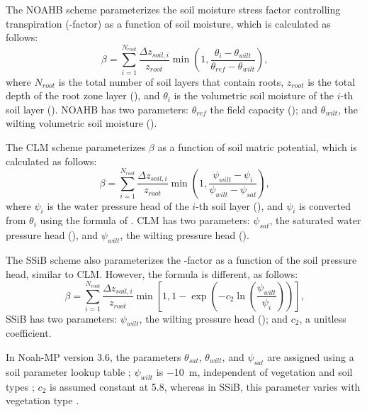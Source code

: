 \documentclass[essd, manuscript]{copernicus}
\let\unit\undefined
\begin{document}
The NOAHB scheme parameterizes the soil moisture stress factor controlling transpiration (\beta{}-factor) as a function of soil moisture, which is calculated as follows:
\begin{equation}
  \beta = \sum_{i=1}^{N_{root}} \frac{\Delta z_{soil,i}}{z_{root}}
  \min(1, \frac{\theta_i - \theta_{wilt}}{\theta_{ref} - \theta_{wilt}})
  \text{,}
\end{equation}
where \(N_{root}\) is the total number of soil layers that contain roots, \(z_{root}\) is the total depth of the root zone layer (\unit{m}), and \(\theta_i\) is the volumetric soil moisture of the \(i\)-th soil layer (\unit{m^3.m^{-3}}). NOAHB has two parameters: \(\theta_{ref}\) the field capacity (\unit{m^3.m^{-3}}); and \(\theta_{wilt}\), the wilting volumetric soil moisture (\unit{m^3.m^{-3}}).

The CLM scheme \citep{oleson2004} parameterizes \(\beta\) as a function of soil matric potential, which is calculated as follows:
\begin{equation}
  \beta = \sum_{i=1}^{N_{root}} \frac{\Delta z_{soil,i}}{z_{root}}
  \min(1, \frac{\psi_{wilt} - \psi_i}{\psi_{wilt} - \psi_{sat}})
  \text{,}
\end{equation}
where \(\psi_i\) is the water pressure head of the \(i\)-th soil layer (\unit{m}), and \(\psi_i\) is converted from \(\theta_i\) using the formula of \citet{clapp1978WRR}. CLM has two parameters: \(\psi_{sat}\), the saturated water pressure head (\unit{m}), and \(\psi_{wilt}\), the wilting pressure head (\unit{m}).

The SSiB scheme \citet{xue1991JC} also parameterizes the \beta{}-factor as a function of the soil pressure head, similar to CLM\@. However, the formula is different, as follows:
\begin{equation}
  \beta = \sum_{i=1}^{N_{root}} \frac{\Delta z_{soil,i}}{z_{root}}
  \min\left[1, 1 - \exp\left(-c_2 \ln(\frac{\psi_{wilt}}{\psi_{i}})\right)\right]
  \text{,}
\end{equation}
SSiB has two parameters: \(\psi_{wilt}\), the wilting pressure head (\unit{m}); and \(c_2\), a unitless coefficient.

In Noah-MP version 3.6, the parameters \(\theta_{sat}\), \(\theta_{wilt}\), and \(\psi_{sat}\) are assigned using a soil parameter lookup table \citep[Table 2]{chen2001MWR}; \(\psi_{wilt}\) is \qty{-10}{m}, independent of vegetation and soil types \citep{niu2011JGRA}; \(c_2\) is assumed constant at \num{5.8}, whereas in SSiB, this parameter varies with vegetation type \citep[Table 2]{xue1991JC}.
\end{document}
